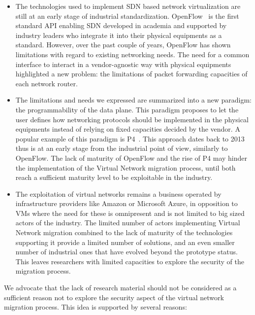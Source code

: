 \begin{itemize}
    \item The technologies used to implement SDN based network virtualization are still at an early stage of industrial standardization. OpenFlow~\cite{Openflow-McKeown2008} is the first standard API enabling SDN developed in academia and supported by industry leaders who integrate it into their physical equipments as a standard. However, over the past couple of years, OpenFlow has shown limitations with regard to existing networking needs. The need for a common interface to interact in a vendor-agnostic way with physical equipments highlighted a new problem: the limitations of packet forwarding capacities of each network router. 
    
    \item The limitations and needs we expressed are summarized into a new paradigm: the programmability of the data plane.
    This paradigm proposes to let the user defines how networking protocols should be implemented in the physical equipments instead of relying on fixed capacities decided by the vendor. A popular example of this paradigm is P4~\cite{P4}.
    This approach dates back to 2013 thus is at an early stage from the industrial point of view, similarly to OpenFlow.
    The lack of maturity of OpenFlow and the rise of P4 may hinder the implementation of the Virtual Network migration process, until both reach a sufficient maturity level to be exploitable in the industry.
    
    \item The exploitation of virtual networks remains a business operated by infrastructure providers like Amazon or Microsoft Azure, in opposition to VMs where the need for these is omnipresent and is not limited to big sized actors of the industry. The limited number of actors implementing Virtual Network migration combined to the lack of maturity of the technologies supporting it provide a limited number of solutions, and an even smaller number of industrial ones that have evolved beyond the prototype status. This leaves researchers with limited capacities to explore the security of the migration process.
\end{itemize}

We advocate that the lack of research material should not be considered as a sufficient reason not to explore the security aspect of the virtual network migration process. This idea is supported by several reasons:

